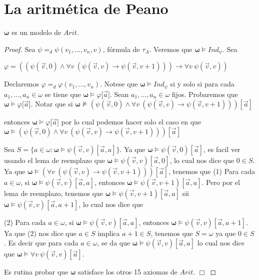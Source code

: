 \section{La aritmética de Peano}

  \begin{lemma} \label{lemma_91}
    \PN $\pmb{\omega}$ es un modelo de $Arit$.
  \end{lemma}
  \begin{proof}
    Sea $\psi =_{d}\psi (v_{1},...,v_{n},v)$, f\'{o}rmula de $\tau _{A}$. Veremos que $\mathbf{\omega }\vDash Ind_{\psi }$. Sea

    $\displaystyle \varphi =((\psi (\vec{v},0)\wedge \forall v\ (\psi (\vec{v},v)\rightarrow \psi (\vec{v},v+1)))\rightarrow \forall v\ \psi (\vec{v},v)) $

    Declaremos $\varphi =_{d}\varphi (v_{1},...,v_{n})$. Notese que $\mathbf{ \omega }\vDash Ind_{\psi }$ si y solo si para cada $a_{1},...,a_{n}\in \omega $ se tiene que $\mathbf{\omega }\vDash \varphi \lbrack \vec{a}]$. Sean $a_{1},...,a_{n}\in \omega $ fijos. Probaremos que $\mathbf{\omega } \vDash \varphi \lbrack \vec{a}]$. Notar que si
    $\displaystyle \mathbf{\omega }\nvDash (\psi (\vec{v},0)\wedge \forall v\ (\psi (\vec{v} ,v)\rightarrow \psi (\vec{v},v+1)))[\vec{a}] $

    entonces $\mathbf{\omega }\vDash \varphi \lbrack \vec{a}]$ por lo cual podemos hacer solo el caso en que
    $\displaystyle \mathbf{\omega }\vDash (\psi (\vec{v},0)\wedge \forall v\ (\psi (\vec{v} ,v)\rightarrow \psi (\vec{v},v+1)))[\vec{a}] $

    Sea $S=\{a\in \omega :\mathbf{\omega }\vDash \psi (\vec{v},v)[\vec{a},a]\}$. Ya que $\mathbf{\omega }\vDash \psi (\vec{v},0)[\vec{a}]$, es facil ver usando el lema de reemplazo que $\mathbf{\omega }\vDash \psi (\vec{v},v)[ \vec{a},0]$, lo cual nos dice que $0\in S$. Ya que $\mathbf{\omega }\vDash (\forall v\ (\psi (\vec{v},v)\rightarrow \psi (\vec{v},v+1)))[\vec{a}]$, tenemos que
    (1) Para cada $a\in \omega $, si $\mathbf{\omega }\vDash \psi (\vec{v} ,v)[\vec{a},a]$, entonces $\mathbf{\omega }\vDash \psi (\vec{v},v+1)[\vec{a} ,a]$.
    Pero por el lema de reemplazo, tenemos que $\mathbf{\omega }\vDash \psi ( \vec{v},v+1)[\vec{a},a]$ sii $\mathbf{\omega }\vDash \psi (\vec{v},v)[\vec{a} ,a+1]$, lo cual nos dice que

    (2) Para cada $a\in \omega $, si $\mathbf{\omega }\vDash \psi (\vec{v} ,v)[\vec{a},a]$, entonces $\mathbf{\omega }\vDash \psi (\vec{v},v)[\vec{a} ,a+1]$.
    Ya que (2) nos dice que $a\in S$ implica $a+1\in S$, tenemos que $S=\omega $ ya que $0\in S$. Es decir que para cada $a\in \omega $, se da que $\mathbf{ \omega }\vDash \psi (\vec{v},v)[\vec{a},a]$ lo cual nos dice que $\mathbf{ \omega }\vDash \forall v\ \psi (\vec{v},v)[\vec{a}]$.

    Es rutina probar que $\mathbf{\omega }$ satisface los otros 15 axiomas de $ Arit$. $\Box$
  \end{proof}

